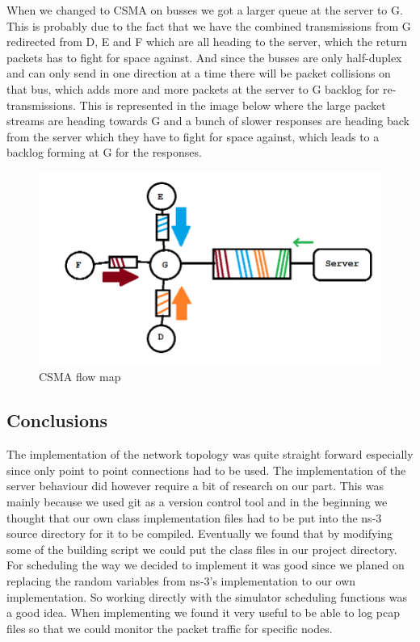 \documentclass{article}
\begin{document}
When we changed to CSMA on busses we got a larger queue at the server to G. This is probably due
to the fact that we have the combined transmissions from G redirected from D, E and F which are 
all heading to the server, which the return packets has to fight for space against. And since the
busses are only half-duplex and can only send in one direction at a time there will be packet 
collisions on that bus, which adds more and more packets at the server to G backlog for re-transmissions.
This is represented in the image below where the large packet streams are heading towards G and a bunch 
of slower responses are heading back from the server which they have to fight for space against, which 
leads to a backlog forming at G for the responses.
\begin{figure}[h!]
  \includegraphics[width=\linewidth]{csmamap.png}
  \caption{CSMA flow map}
  \label{fig:csma}
\end{figure}
\newpage
\subsection{Conclusions}
The implementation of the network topology was quite straight forward especially since only point to point connections had to be used.
The implementation of the server behaviour did however require a bit of research on our part.
This was mainly because we used git as a version control tool and in the beginning we thought that our own class implementation files had to be put into the ns-3 source directory for it to be compiled.
Eventually we found that by modifying some of the building script we could put the class files in our project directory.
For scheduling the way we decided to implement it was good since we planed on replacing the random variables from ns-3's implementation to our own implementation.
So working directly with the simulator scheduling functions was a good idea.
When implementing we found it very useful to be able to log pcap files so that we could monitor the packet traffic for specific nodes.

\newpage


\end{document}

